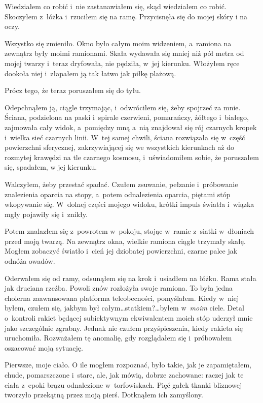 \documentclass[oneside,polish,11pt,sfheadings]{mwbk}
\begin{document}
Wiedziałem co robić i~nie zastanawiałem się, skąd wiedziałem co robić.
Skoczyłem z~łóżka i~rzuciłem się na ramę. Przycisnęła się do mojej skóry
i na oczy.

Wszystko się zmieniło. Okno było całym moim widzeniem, a~ramiona na
zewnątrz były moimi ramionami. Skała wydawała się mniej niż pół metra od
mojej twarzy i~teraz dryfowała, nie pędziła, w~jej kierunku. Włożyłem
ręce dookoła niej i~złapałem ją tak łatwo jak piłkę plażową.

Prócz tego, że teraz poruszałem się do tyłu.

Odepchnąłem ją, ciągle trzymając, i~odwróciłem się, żeby spojrzeć za
mnie. Ściana, podzielona na paski i~spirale czerwieni, pomarańczy,
żółtego i~białego, zajmowała cały widok, a~pomiędzy mną a~nią znajdował
się rój czarnych kropek i~wielka sieć czarnych linii. W~tej samej
chwili, ściana rozwiązała się w~część powierzchni sferycznej,
zakrzywiającej się we wszystkich kierunkach aż do rozmytej krawędzi na
tle czarnego kosmosu, i~uświadomiłem sobie, że poruszałem się, spadałem,
w jej kierunku.

Walczyłem, żeby przestać spadać. Czułem zsuwanie, pełzanie i~próbowanie
znalezienia oparcia na stopy, a~potem odnalezienia oparcia, piętami stóp
wkopywanie się. W~dolnej części mojego widoku, krótki impuls światła i~wiązka mgły pojawiły się i~znikły.

Potem znalazłem się z~powrotem w~pokoju, stojąc w~ramie z~siatki w~dłoniach przed moją twarzą. Na zewnątrz okna, wielkie ramiona ciągle
trzymały skałę. Mogłem zobaczyć światło i~cień jej dziobatej
powierzchni, czarne palce jak odnóża owadów.

Oderwałem się od ramy, odsunąłem się na krok i~usiadłem na łóżku. Rama
stała jak druciana rzeźba. Powoli znów rozłożyła swoje ramiona. To była
jedna cholerna zaawansowana platforma teleobecności, pomyślałem. Kiedy w~niej byłem, czułem się, jakbym był całym\ldots statkiem?\ldots byłem w~\emph{moim} ciele. Detal o~kontroli rakiet będącej subiektywnym
ekwiwalentem moich stóp uderzył mnie jako szczególnie zgrabny. Jednak
nie czułem przyśpieszenia, kiedy rakieta się uruchomiła. Rozważałem tę
anomalię, gdy rozglądałem się i~próbowałem oszacować moją sytuację.

Pierwsze, moje ciało. O ile mogłem rozpoznać, było takie, jak je
zapamiętałem, chude, pomarszczone i~stare, ale, jak mówią, dobrze
zachowane: raczej jak te ciała z~epoki brązu odnalezione w~torfowiskach.
Pięć gałek tkanki bliznowej tworzyło przekątną przez moją pierś.
Dotknąłem ich zamyślony.
\end{document}
